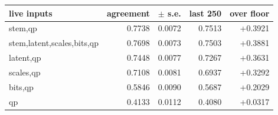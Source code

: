 \begin{tabular}{lrrrr}
\toprule
live inputs & agreement & $\pm$ s.e. & last 250 & over floor \\
\midrule
stem,qp & 0.7738 & 0.0072 & 0.7513 & +0.3921 \\
stem,latent,scales,bits,qp & 0.7698 & 0.0073 & 0.7503 & +0.3881 \\
latent,qp & 0.7448 & 0.0077 & 0.7267 & +0.3631 \\
scales,qp & 0.7108 & 0.0081 & 0.6937 & +0.3292 \\
bits,qp & 0.5846 & 0.0090 & 0.5687 & +0.2029 \\
qp & 0.4133 & 0.0112 & 0.4080 & +0.0317 \\
\bottomrule
\end{tabular}
